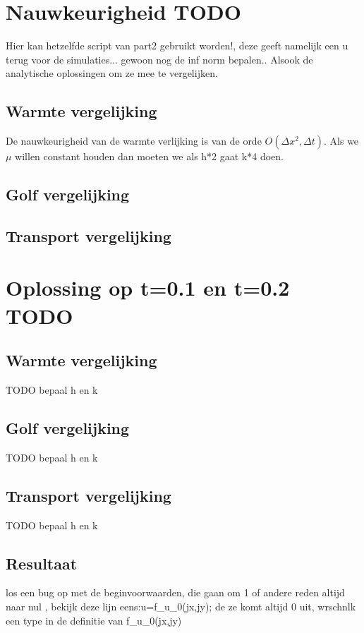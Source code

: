 \documentclass[11pt]{article} %
\begin{document}
\section{Nauwkeurigheid TODO}
Hier kan hetzelfde script van part2 gebruikt worden!, deze geeft namelijk een u terug voor de simulaties... gewoon nog de inf norm bepalen.. Alsook de analytische oplossingen om ze mee te vergelijken.
	\subsection{Warmte vergelijking}
	De nauwkeurigheid van de warmte verlijking is van de orde $O(\Delta x^2 , \Delta t) $. Als we $\mu$ willen constant houden dan moeten we als h*2 gaat k*4 doen.
	
		\begin{center}
			
		\end{center}
	
	
	\subsection{Golf vergelijking}
		\begin{center}
			
		\end{center}
	\subsection{Transport vergelijking}
		\begin{center}
			
		\end{center}
	
	
\clearpage
\section{Oplossing op t=0.1 en t=0.2 TODO}
	\subsection{Warmte vergelijking}
	TODO bepaal h en k
	\subsection{Golf vergelijking}
	TODO bepaal h en k
	\subsection{Transport vergelijking}
	TODO bepaal h en k
	\subsection{Resultaat}
	los een bug op met de beginvoorwaarden, die gaan om 1 of andere reden altijd naar nul , bekijk deze lijn eens:u=f\_u\_0(jx,jy); de ze komt altijd 0 uit, wrschnlk een type in de definitie van f\_u\_0(jx,jy)
	
\end{document}
